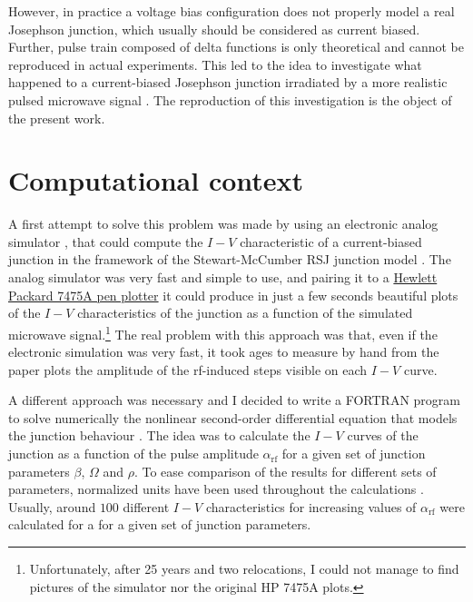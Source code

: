 However, in practice a voltage bias configuration does not properly model a real Josephson junction, which usually should be considered as current biased.
Further, pulse train composed of delta functions is only theoretical and cannot be reproduced in actual experiments. 
This led to the idea to investigate what happened to a current-biased Josephson junction irradiated by a more realistic pulsed microwave signal \cite{Maggi:1996, Maggi:1997}. 
The reproduction of this investigation is the object of the present work.


\section{Computational context}
\label{computational-context}

A first attempt to solve this problem was made by using an electronic analog simulator \cite {Henry:1981}, that could compute the $I-V$ characteristic of a current-biased junction in the framework of the Stewart-McCumber RSJ junction model \cite{McCumber:1968, Stewart:1974}.
The analog simulator was very fast and simple to use, and pairing it to a \href{http://www.hpmuseum.net/display_item.php?hw=7}{Hewlett Packard 7475A pen plotter} it could produce in just a few seconds beautiful plots of the $I-V$ characteristics of the junction as a function of the simulated microwave signal.\footnote{Unfortunately, after 25 years and two relocations, I could not manage to find pictures of the simulator nor the original HP 7475A plots.} The real problem with this approach was that, even if the electronic simulation was very fast, it took ages to measure by hand from the paper plots the amplitude of the rf-induced steps visible on each $I-V$ curve.

A different approach was necessary and I decided to write a FORTRAN program to solve numerically the nonlinear second-order differential equation that models the junction behaviour \cite{McCumber:1968, Stewart:1974}. The idea was to calculate the $I-V$ curves of the junction as a function of the pulse amplitude $\alpha_\mathrm{rf}$ for a given set of junction parameters $\beta$, $\Omega$ and $\rho$. To ease comparison of the results for different sets of parameters, normalized units have been used throughout the calculations \cite{McCumber:1968, Stewart:1974}. Usually, around $100$ different $I-V$ characteristics for increasing values of $\alpha_\mathrm{rf}$ were calculated for a for a given set of junction parameters.

